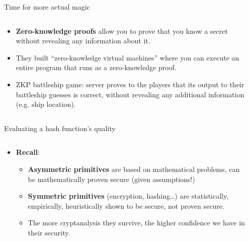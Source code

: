 \documentclass[aspectratio=169, lualatex, handout]{beamer}
\begin{document}
\begin{frame}{Time for more actual magic}
	\begin{columns}[c]
		\begin{column}{0.6\textwidth}
			\begin{itemize}[<+->]
				\item \textbf{Zero-knowledge proofs} allow you to prove that you know
				      a secret without revealing any information about it.
				\item They built ``zero-knowledge virtual machines'' where you can execute
				      an entire program that runs as a zero-knowledge proof.
				\item ZKP battleship game: server proves to the players that its
				      output to their battleship guesses is correct, without revealing any
				      additional information (e.g. ship location).
			\end{itemize}
		\end{column}

		\begin{column}{0.4\textwidth}
		\end{column}
	\end{columns}
\end{frame}

\begin{frame}{Evaluating a hash function's quality}
	\begin{columns}[c]
		\begin{column}{0.6\textwidth}
			\begin{itemize}[<+->]
				\item \textbf{Recall}:
				      \begin{itemize}[<+->]
					      \item \textbf{Asymmetric primitives} are based on mathematical
					            problems, can be mathematically proven secure (given assumptions!)
					      \item \textbf{Symmetric primitives} (encryption, hashing\ldots)
					            are statistically, empirically, heuristically shown to be secure,
					            not proven secure.
					      \item The more cryptanalysis they survive, the higher confidence
					            we have in their security.
				      \end{itemize}
			\end{itemize}
		\end{column}

		\begin{column}{0.4\textwidth}
		\end{column}
	\end{columns}
\end{frame}
\end{document}
